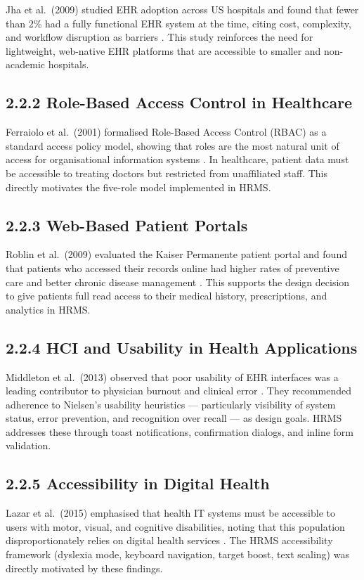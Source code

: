 \documentclass[12pt,a4paper]{report}
\begin{document}
Jha et al.\ (2009) studied EHR adoption across US hospitals and found that fewer than 2\% had a fully functional EHR system at the time, citing cost, complexity, and workflow disruption as barriers \cite{jha2009}. This study reinforces the need for lightweight, web-native EHR platforms that are accessible to smaller and non-academic hospitals.

\subsection{2.2.2 Role-Based Access Control in Healthcare}
Ferraiolo et al.\ (2001) formalised Role-Based Access Control (RBAC) as a standard access policy model, showing that roles are the most natural unit of access for organisational information systems \cite{ferraiolo2001}. In healthcare, patient data must be accessible to treating doctors but restricted from unaffiliated staff. This directly motivates the five-role model implemented in HRMS.

\subsection{2.2.3 Web-Based Patient Portals}
Roblin et al.\ (2009) evaluated the Kaiser Permanente patient portal and found that patients who accessed their records online had higher rates of preventive care and better chronic disease management \cite{roblin2009}. This supports the design decision to give patients full read access to their medical history, prescriptions, and analytics in HRMS.

\subsection{2.2.4 HCI and Usability in Health Applications}
Middleton et al.\ (2013) observed that poor usability of EHR interfaces was a leading contributor to physician burnout and clinical error \cite{middleton2013}. They recommended adherence to Nielsen's usability heuristics — particularly visibility of system status, error prevention, and recognition over recall — as design goals. HRMS addresses these through toast notifications, confirmation dialogs, and inline form validation.

\subsection{2.2.5 Accessibility in Digital Health}
Lazar et al.\ (2015) emphasised that health IT systems must be accessible to users with motor, visual, and cognitive disabilities, noting that this population disproportionately relies on digital health services \cite{lazar2015}. The HRMS accessibility framework (dyslexia mode, keyboard navigation, target boost, text scaling) was directly motivated by these findings.
\end{document}
